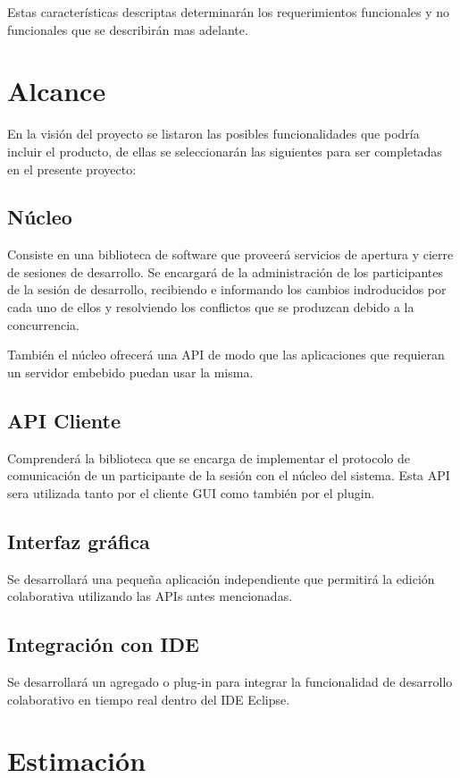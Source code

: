 \documentclass[12pt,a4paper]{article}
\begin{document}
Estas características descriptas determinarán los requerimientos funcionales y no funcionales que se describirán mas adelante.

	\section{Alcance}
   En la visión del proyecto se listaron las posibles funcionalidades que podría incluir el producto, de ellas se seleccionarán las siguientes para ser completadas en el presente proyecto:
   
	\subsection{Núcleo}
	Consiste en una biblioteca de software que proveerá servicios de apertura y cierre de sesiones de desarrollo. Se encargará de la administración de los participantes de la sesión de desarrollo, recibiendo e informando los cambios indroducidos por cada uno de ellos y resolviendo los conflictos que se produzcan debido a la concurrencia.
	
	También el núcleo ofrecerá una API de modo que las aplicaciones que requieran un servidor embebido puedan usar la misma.

	\subsection{API Cliente}
	Comprenderá la biblioteca que se encarga de implementar el protocolo de comunicación de un participante de la sesión con el núcleo del sistema. Esta API sera utilizada tanto por el cliente GUI como también por el plugin.

	\subsection{Interfaz gráfica}
	Se desarrollará una pequeña aplicación independiente que permitirá la edición colaborativa utilizando las APIs antes mencionadas.

	\subsection{Integración con IDE}
	Se desarrollará un agregado o plug-in para integrar la funcionalidad de desarrollo colaborativo en tiempo real dentro del IDE Eclipse.

	\section{Estimación}
\end{document}

